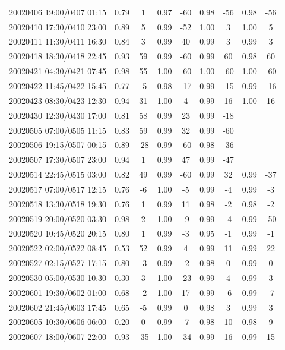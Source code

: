 \documentclass[linenumbers,draft]{agujournal}
\begin{document}
\begin{center}
\begin{longtable}{c||cc|cc|cc|cc}
20020406 19:00/0407 01:15 & 0.79 & 1 & 0.97 & -60 & 0.98 & -56 & 0.98 & -56 \\
20020410 17:30/0410 23:00 & 0.89 & 5 & 0.99 & -52 & 1.00 & 3 & 1.00 & 5 \\
20020411 11:30/0411 16:30 & 0.84 & 3 & 0.99 & 40 & 0.99 & 3 & 0.99 & 3 \\
20020418 18:30/0418 22:45 & 0.93 & 59 & 0.99 & -60 & 0.99 & 60 & 0.98 & 60 \\
20020421 04:30/0421 07:45 & 0.98 & 55 & 1.00 & -60 & 1.00 & -60 & 1.00 & -60 \\
20020422 11:45/0422 15:45 & 0.77 & -5 & 0.98 & -17 & 0.99 & -15 & 0.99 & -16 \\
20020423 08:30/0423 12:30 & 0.94 & 31 & 1.00 & 4 & 0.99 & 16 & 1.00 & 16 \\
20020430 12:30/0430 17:00 & 0.81 & 58 & 0.99 & 23 & 0.99 & -18 & & \\
20020505 07:00/0505 11:15 & 0.83 & 59 & 0.99 & 32 & 0.99 & -60 & & \\
20020506 19:15/0507 00:15 & 0.89 & -28 & 0.99 & -60 & 0.98 & -36 & & \\
20020507 17:30/0507 23:00 & 0.94 & 1 & 0.99 & 47 & 0.99 & -47 & & \\
20020514 22:45/0515 03:00 & 0.82 & 49 & 0.99 & -60 & 0.99 & 32 & 0.99 & -37 \\
20020517 07:00/0517 12:15 & 0.76 & -6 & 1.00 & -5 & 0.99 & -4 & 0.99 & -3 \\
20020518 13:30/0518 19:30 & 0.76 & 1 & 0.99 & 11 & 0.98 & -2 & 0.98 & -2 \\
20020519 20:00/0520 03:30 & 0.98 & 2 & 1.00 & -9 & 0.99 & -4 & 0.99 & -50 \\
20020520 10:45/0520 20:15 & 0.80 & 1 & 0.99 & -3 & 0.95 & -1 & 0.99 & -1 \\
20020522 02:00/0522 08:45 & 0.53 & 52 & 0.99 & 4 & 0.99 & 11 & 0.99 & 22 \\
20020527 02:15/0527 17:15 & 0.80 & -3 & 0.99 & -2 & 0.98 & 0 & 0.99 & 0 \\
20020530 05:00/0530 10:30 & 0.30 & 3 & 1.00 & -23 & 0.99 & 4 & 0.99 & 3 \\
20020601 19:30/0602 01:00 & 0.68 & -2 & 1.00 & 17 & 0.99 & -6 & 0.99 & -7 \\
20020602 21:45/0603 17:45 & 0.65 & -5 & 0.99 & 0 & 0.98 & 3 & 0.99 & 3 \\
20020605 10:30/0606 06:00 & 0.20 & 0 & 0.99 & -7 & 0.98 & 10 & 0.98 & 9 \\
20020607 18:00/0607 22:00 & 0.93 & -35 & 1.00 & -34 & 0.99 & 16 & 0.99 & 15 \\

\end{longtable}
\end{center}
\end{document}
